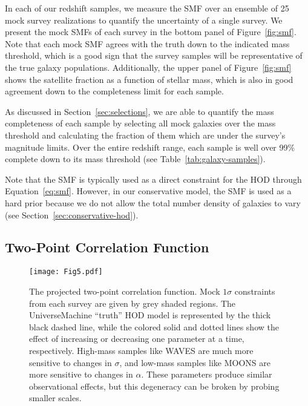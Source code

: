 \documentclass[twocolumn,twocolappendix]{aastex63}
\begin{document}
In each of our redshift samples, we measure the SMF over an ensemble of 25 mock survey realizations to quantify the uncertainty of a single survey. We present the mock SMFs of each survey in the bottom panel of Figure~\ref{fig:smf}. Note that each mock SMF agrees with the truth down to the indicated mass threshold, which is a good sign that the survey samples will be representative of the true galaxy populations. Additionally, the upper panel of Figure~\ref{fig:smf} shows the satellite fraction as a function of stellar mass, which is also in good agreement down to the completeness limit for each sample.

As discussed in Section~\ref{sec:selections}, we are able to quantify the mass completeness of each sample by selecting all mock galaxies over the mass threshold and calculating the fraction of them which are under the survey's magnitude limits. Over the entire redshift range, each sample is well over 99\% complete down to its mass threshold (see Table~\ref{tab:galaxy-samples}).

Note that the SMF is typically used as a direct constraint for the HOD through Equation~\ref{eq:smf}. However, in our conservative model, the SMF is used as a hard prior because we do not allow the total number density of galaxies to vary (see Section~\ref{sec:conservative-hod}).

\subsection{Two-Point Correlation Function}
\label{sec:2pcf}

\begin{figure*}[ht!]
\texttt{[image: Fig5.pdf]}
\caption{The projected two-point correlation function. Mock $1\sigma$ constraints from each survey are given by grey shaded regions. The UniverseMachine ``truth'' HOD model is represented by the thick black dashed line, while the colored solid and dotted lines show the effect of increasing or decreasing one parameter at a time, respectively. High-mass samples like WAVES are much more sensitive to changes in $\sigma$, and low-mass samples like MOONS are more sensitive to changes in $\alpha$. These parameters produce similar observational effects, but this degeneracy can be broken by probing smaller scales.
\label{fig:2pcf}}
\end{figure*}
\end{document}
